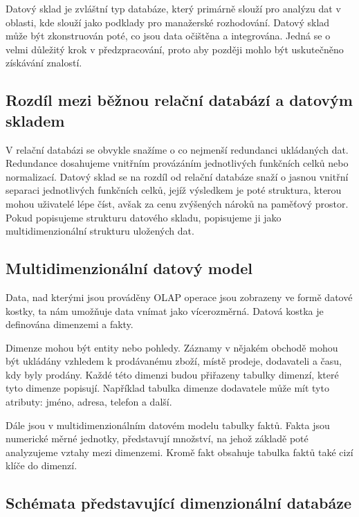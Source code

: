  Datový sklad je zvláštní typ databáze, který primárně slouží pro analýzu dat v oblasti, kde slouží jako podklady pro manažerské rozhodování. \cite{sklad}
 Datový sklad může být zkonstruován poté, co jsou data očištěna a integrována. Jedná se o velmi důležitý krok v předzpracování, proto aby později mohlo být uskutečněno získávání znalostí. \cite[Kapitola~4]{Kamber}
 
\subsection*{Rozdíl mezi běžnou relační databází a datovým skladem}

V relační databázi se obvykle snažíme o co nejmenší redundanci ukládaných dat. Redundance dosahujeme vnitřním provázáním jednotlivých funkčních celků nebo normalizací. Datový sklad se na rozdíl od relační databáze snaží o jasnou vnitřní separaci jednotlivých funkčních celků, jejíž výsledkem je poté struktura, kterou mohou uživatelé lépe číst, avšak za cenu zvýšených nároků na paměťový prostor. Pokud popisujeme strukturu datového skladu, popisujeme ji jako multidimenzionální strukturu uložených dat. \cite{sklad}

\subsection{Multidimenzionální datový model}

Data, nad kterými jsou prováděny OLAP operace jsou zobrazeny ve formě datové kostky, ta nám umožňuje data vnímat jako vícerozměrná. Datová kostka je definována dimenzemi a fakty.

Dimenze mohou být entity nebo pohledy. Záznamy v nějakém obchodě mohou být ukládány vzhledem k prodávanému zboží, místě prodeje, dodavateli a času, kdy byly prodány. Každé této dimenzi budou přiřazeny tabulky dimenzí, které tyto dimenze popisují. Například tabulka dimenze dodavatele může mít tyto atributy: jméno, adresa, telefon a další.

Dále jsou v multidimenzionálním datovém modelu tabulky faktů. Fakta jsou numerické měrné jednotky, představují množství, na jehož základě poté analyzujeme vztahy mezi dimenzemi. Kromě fakt obsahuje tabulka faktů také cizí klíče do dimenzí. \cite[Kapitola~4]{Kamber}

\subsection*{Schémata představující dimenzionální databáze}

